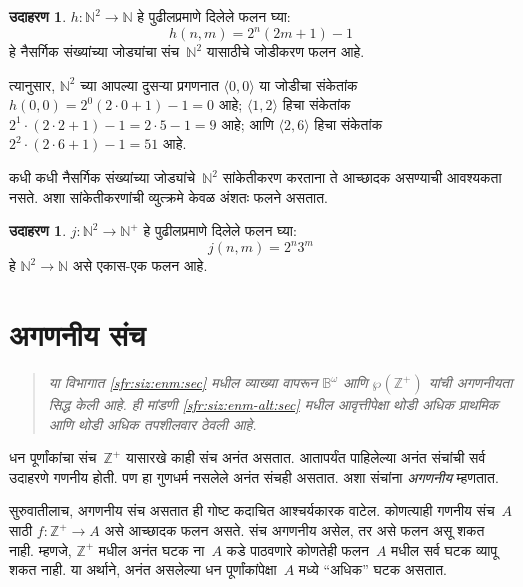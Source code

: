 \documentclass[11pt,a4paper,openany]{book}
\theoremstyle{definition}
\newtheorem{ex}[defn]{उदाहरण}
\newenvironment{explain}{}{}
\newcommand{\Pow}[1]{\wp(#1)}
\newcommand{\tuple}[1]{\langle #1\rangle}
\newcommand{\Nat}{\mathbb{N}}
\newcommand{\PosInt}{\mathbb{Z}^{+}}
\newcommand{\Bin}{\mathbb{B}}
\newenvironment{editorial}{\begin{quote}\small\itshape}{\end{quote}}
\begin{document}
\begin{ex}
$h\colon \Nat^2 \to \Nat$ हे पुढीलप्रमाणे दिलेले फलन घ्या:
\[
h(n,m) = 2^n (2m+1) - 1
\]
हे नैसर्गिक संख्यांच्या जोड्यांचा संच~$\Nat^2$ यासाठीचे जोडीकरण फलन
आहे.
\end{ex}

\begin{explain}
त्यानुसार, $\Nat^2$ च्या आपल्या दुसऱ्या प्रगणनात $\tuple{0,0}$ या
जोडीचा संकेतांक $h(0,0) = 2^0(2\cdot 0+1) - 1 = 0$ आहे;
$\tuple{1,2}$ हिचा संकेतांक $2^{1} \cdot (2 \cdot 2 + 1) - 1 = 2
\cdot 5 - 1 = 9$ आहे; आणि $\tuple{2,6}$ हिचा संकेतांक $2^{2} \cdot (2
\cdot 6 + 1) - 1 = 51$ आहे.
\end{explain}

कधी कधी नैसर्गिक संख्यांच्या जोड्यांचे~$\Nat^2$ सांकेतीकरण करताना ते
आच्छादक असण्याची आवश्यकता नसते. अशा सांकेतीकरणांची व्युत्क्रमे केवळ
अंशतः फलने असतात.

\begin{ex}
$j\colon \Nat^2 \to \Nat^+$ हे पुढीलप्रमाणे दिलेले फलन घ्या:
\[
j(n,m) = 2^n3^m
\]
हे $\Nat^2 \to \Nat$ असे एकास-एक फलन आहे.
\end{ex}









\section{अगणनीय संच}\label{sfr:siz:nen:sec}

\begin{editorial}
  या विभागात \ref{sfr:siz:enm:sec} मधील व्याख्या वापरून $\Bin^\omega$ आणि
  $\Pow{\PosInt}$ यांची अगणनीयता सिद्ध केली आहे. ही मांडणी
  \ref{sfr:siz:enm-alt:sec} मधील आवृत्तीपेक्षा थोडी अधिक प्राथमिक आणि
  थोडी अधिक तपशीलवार ठेवली आहे.
\end{editorial}

धन पूर्णांकांचा संच~$\PosInt$ यासारखे काही संच अनंत असतात. आतापर्यंत
पाहिलेल्या अनंत संचांची सर्व उदाहरणे गणनीय होती. पण हा गुणधर्म
नसलेले अनंत संचही असतात. अशा संचांना \emph{अगणनीय} म्हणतात.

सुरुवातीलाच, अगणनीय संच असतात ही गोष्ट कदाचित आश्चर्यकारक
वाटेल. कोणत्याही गणनीय संच~$A$ साठी $f \colon \PosInt \to A$
असे आच्छादक फलन असते. संच अगणनीय असेल, तर असे फलन
असू शकत नाही. म्हणजे, $\PosInt$ मधील अनंत घटक ना~$A$ कडे
पाठवणारे कोणतेही फलन~$A$ मधील सर्व घटक व्यापू शकत नाही. या अर्थाने,
अनंत असलेल्या धन पूर्णांकांपेक्षा~$A$ मध्ये ``अधिक'' घटक असतात.
\end{document}
